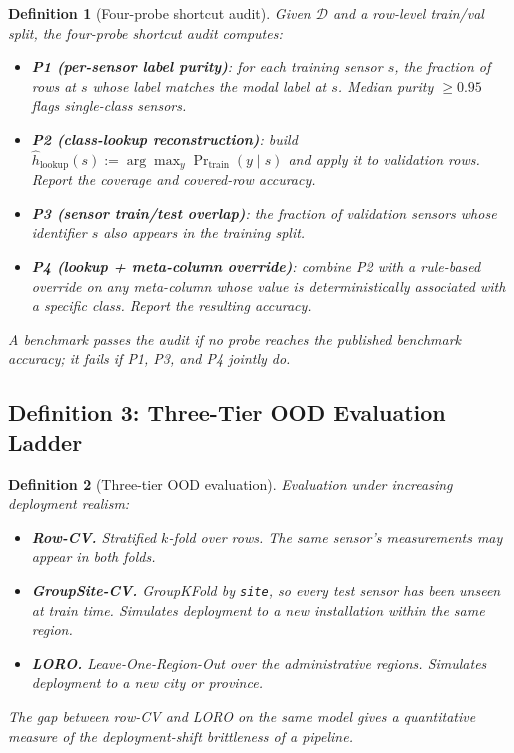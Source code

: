 \documentclass[3p,times,authoryear]{elsarticle}
\newtheorem{definition}{Definition}
\theoremstyle{remark}
\begin{document}
\begin{definition}[Four-probe shortcut audit]\label{def:audit}
Given $\mathcal{D}$ and a row-level train/val split,
the \emph{four-probe shortcut audit} computes:
\begin{itemize}
\item \textbf{P1 (per-sensor label purity)}: for each training
sensor $s$, the fraction of rows at $s$ whose label matches
the modal label at $s$. Median purity $\geq 0.95$ flags
single-class sensors.

\item \textbf{P2 (class-lookup reconstruction)}: build
$\widehat{h}_{\mathrm{lookup}}(s) := \arg\max_y
\Pr_{\mathrm{train}}(y \mid s)$ and apply it to validation
rows. Report the coverage and covered-row accuracy.

\item \textbf{P3 (sensor train/test overlap)}: the fraction of
validation sensors whose identifier $s$ also appears in the
training split.

\item \textbf{P4 (lookup + meta-column override)}: combine P2
with a rule-based override on any meta-column whose value is
deterministically associated with a specific class. Report
the resulting accuracy.
\end{itemize}
A benchmark passes the audit if no probe reaches the published
benchmark accuracy; it fails if P1, P3, and P4 jointly do.
\end{definition}

\subsection{Definition 3: Three-Tier OOD Evaluation Ladder}\label{sec:method-ood}

\begin{definition}[Three-tier OOD evaluation]\label{def:ood}
Evaluation under increasing deployment realism:
\begin{itemize}
\item \textbf{Row-CV.} Stratified $k$-fold over rows. The same
sensor's measurements may appear in both folds.
\item \textbf{GroupSite-CV.} GroupKFold by \texttt{site}, so
every test sensor has been unseen at train time. Simulates
deployment to a new installation within the same region.
\item \textbf{LORO.} Leave-One-Region-Out over the
administrative regions. Simulates deployment to a new city
or province.
\end{itemize}
The gap between row-CV and LORO on the same model gives a
quantitative measure of the deployment-shift brittleness of a
pipeline.
\end{definition}
\end{document}
